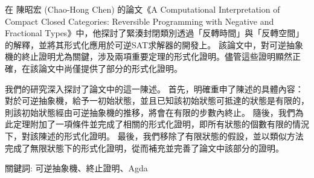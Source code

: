 \begin{abstractzh}
    在 陳昭宏 (Chao-Hong Chen) 的論文《A Computational Interpretation of Compact Closed Categories: Reversible Programming with Negative and Fractional Types》中，他探討了緊湊封閉類別透過「反轉時間」與「反轉空間」的解釋，並將其形式化應用於可逆SAT求解器的開發上。
    該論文中，對可逆抽象機的終止證明尤為關鍵，涉及兩項重要定理的形式化證明。儘管這些證明顯然正確，在該論文中尚僅提供了部分的形式化證明。
    
    我們的研究深入探討了論文中的這一陳述。
    首先，明確重申了陳述的具體內容：對於可逆抽象機，給予一初始狀態，並且已知該初始狀態可抵達的狀態是有限的，則該初始狀態經由可逆抽象機的推移，將會在有限的步數內終止。
    隨後，我們為此定理附加了一項條件並完成了相關的形式化證明，即所有狀態的個數有限的情況下，對該陳述的形式化證明。
    最後，我們移除了有限狀態的假設，並以類似方法完成了無限狀態下的形式化證明，從而補充並完善了論文中該部分的證明。

\vspace{17cm}

關鍵詞: 可逆抽象機、終止證明、Agda

\end{abstractzh}